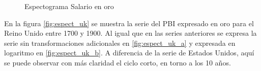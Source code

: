 \documentclass[a4paper]{article}
\begin{document}
\begin{figure}[H]
	\centering
	\caption{Espectograma Salario en oro} \label{fig:espect_wg}
\end{figure}


En la figura \ref{fig:espect_uk} se muestra la serie del PBI expresado en oro para el Reino Unido entre 1700 y 1900. Al igual que en las series anteriores se expresa la serie sin transformaciones adicionales en \ref{fig:espect_uk_a} y expresada en logaritmo en \ref{fig:espect_uk_b}. A diferencia de la serie de Estados Unidos, aquí se puede observar con más claridad el ciclo corto, en torno a los 10 años. 
\end{document}
